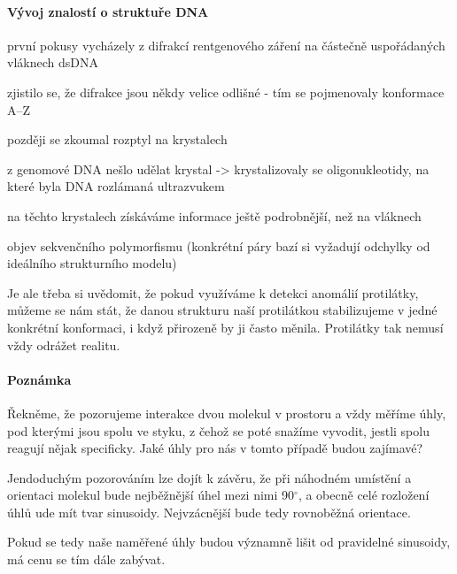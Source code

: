 \documentclass[DIV=8]{scrreprt}
\newcommand{\mybox}[2]{
    \paragraph{#1} #2
}
\begin{document}
\paragraph{Vývoj znalostí o struktuře DNA}
\begin{myItemize}[nosep]
    \item první pokusy vycházely z difrakcí rentgenového záření na částečně uspořádaných vláknech dsDNA
\begin{myItemize}[nosep]
    \item zjistilo se, že difrakce jsou někdy velice odlišné - tím se pojmenovaly konformace A--Z
\end{myItemize}

    \item později se zkoumal rozptyl na krystalech
\begin{myItemize}[nosep]
    \item z genomové DNA nešlo udělat krystal -> krystalizovaly se oligonukleotidy, na které byla DNA rozlámaná ultrazvukem
\end{myItemize}

    \item na těchto krystalech získáváme informace ještě podrobnější, než na vláknech
\begin{myItemize}[nosep]
    \item objev sekvenčního polymorfismu (konkrétní páry bazí si vyžadují odchylky od ideálního strukturního modelu)
\end{myItemize}

\end{myItemize}



Je ale třeba si uvědomit, že pokud využíváme k detekci anomálií protilátky, můžeme se nám stát, že danou strukturu naší protilátkou stabilizujeme v jedné konkrétní konformaci, i když přirozeně by ji často měnila. Protilátky tak nemusí vždy odrážet realitu.

\mybox{Poznámka}{Řekněme, že pozorujeme interakce dvou molekul v prostoru a vždy měříme úhly, pod kterými jsou spolu ve styku, z čehož se poté snažíme vyvodit, jestli spolu reagují nějak specificky. Jaké úhly pro nás v tomto případě budou zajímavé?

Jendoduchým pozorováním lze dojít k závěru, že při náhodném umístění a orientaci molekul bude nejběžnější úhel mezi nimi 90\(^{\circ}\), a obecně celé rozložení úhlů ude mít tvar sinusoidy.  Nejvzácnější bude tedy rovnoběžná orientace.

Pokud se tedy naše naměřené úhly budou významně lišit od pravidelné sinusoidy, má cenu se tím dále zabývat.}
\end{document}
